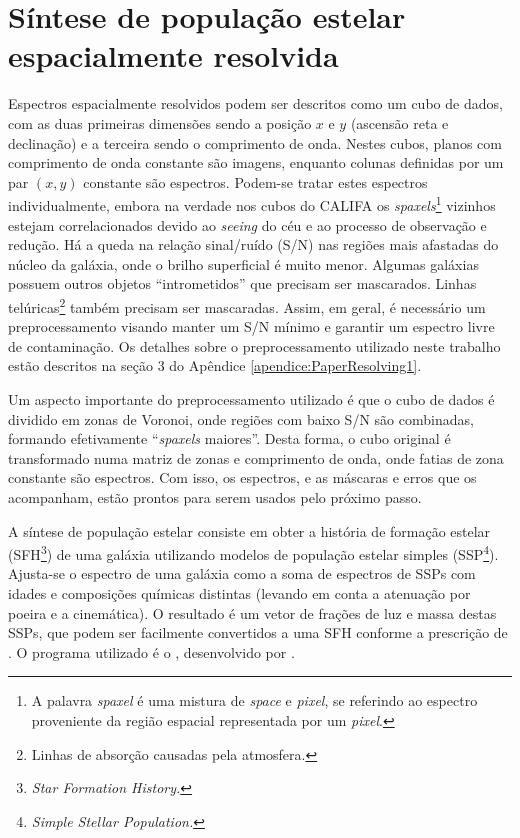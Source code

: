 
\section{Síntese de população estelar espacialmente resolvida}
\label{sec:Intro:Sintese}

Espectros espacialmente resolvidos podem ser descritos como um cubo de dados,
com as duas primeiras dimensões sendo a posição $x$ e $y$ (ascensão reta e
declinação) e a terceira sendo o comprimento de onda. Nestes cubos, planos com
comprimento de onda constante são imagens, enquanto colunas definidas por um par
$(x, y)$ constante são espectros. Podem-se tratar estes espectros
individualmente, embora na verdade nos cubos do CALIFA os {\em
spaxels}\footnote{A palavra {\em spaxel} é uma mistura de {\em space} e {\em
pixel}, se referindo ao espectro proveniente da região espacial representada por
um {\em pixel}.} vizinhos estejam correlacionados devido ao {\em seeing} do céu
e ao processo de observação e redução. Há a queda na relação sinal/ruído (S/N)
nas regiões mais afastadas do núcleo da galáxia, onde o brilho superficial é
muito menor.
Algumas galáxias possuem outros objetos ``intrometidos'' que precisam ser
mascarados. Linhas telúricas\footnote{Linhas de absorção causadas pela
atmosfera.} também precisam ser mascaradas. Assim, em geral, é necessário um
preprocessamento visando manter um S/N mínimo e garantir um espectro livre de
contaminação. Os detalhes sobre o preprocessamento utilizado neste trabalho
estão descritos na seção 3 do Apêndice \ref{apendice:PaperResolving1}.

Um aspecto importante do preprocessamento utilizado é que o cubo de dados é
dividido em zonas de Voronoi, onde regiões com baixo S/N são combinadas,
formando efetivamente ``{\em spaxels} maiores''. Desta forma, o cubo original é
transformado numa matriz de zonas e comprimento de onda, onde fatias de zona
constante são espectros. Com isso, os espectros, e as máscaras e erros que os
acompanham, estão prontos para serem usados pelo próximo passo.

A síntese de população estelar consiste em obter a história de formação estelar
(SFH\footnote{\em Star Formation History.}) de uma galáxia utilizando modelos de
população estelar simples (SSP\footnote{\em Simple Stellar Population.}).
Ajusta-se o espectro de uma galáxia como a soma de espectros de SSPs com idades
e composições químicas distintas (levando em conta a atenuação por poeira e a
cinemática).
O resultado é um vetor de frações de luz e massa destas SSPs, que podem ser
facilmente convertidos a uma SFH conforme a prescrição de \cite{Asari2007}.
O programa utilizado é o \starlight, desenvolvido por \cite{CidFernandes2005}.

